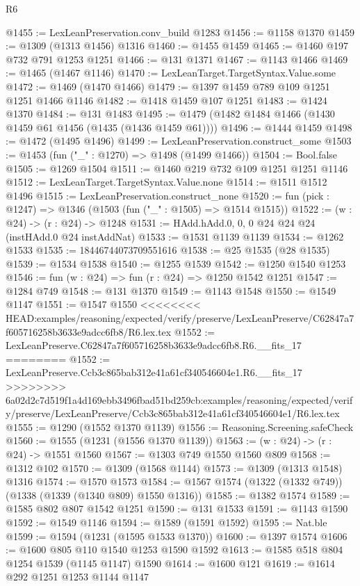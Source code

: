 \begin{lexlean}{R6}
\begin{coremodule}
{{{{{{{{{{{{{{{{{{{{{{{{{{{{{{{{{{{{{{{{{{{{{{{{{{{{{{{{{{{{{@1455 := LexLeanPreservation.conv_build @1283
@1456 := @1158 @1370
@1459 := @1309 (@1313 @1456) @1316
@1460 := @1455 @1459
@1465 := @1460 @197 @732 @791 @1253 @1251
@1466 := @131 @1371
@1467 := @1143 @1466
@1469 := @1465 (@1467 @1146)
@1470 := LexLeanTarget.TargetSyntax.Value.some
@1472 := @1469 (@1470 @1466)
@1479 := @1397 @1459 @789 @109 @1251 @1251 @1466 @1146
@1482 := @1418 @1459 @107 @1251
@1483 := @1424 @1370
@1484 := @131 @1483
@1495 := @1479 (@1482 @1484 @1466 (@1430 @1459 @61 @1456 (@1435 (@1436 @1459 @61))))
@1496 := @1444 @1459
@1498 := @1472 (@1495 @1496)
@1499 := LexLeanPreservation.construct_some
@1503 := @1453 (fun ("_" : @1270) => @1498 (@1499 @1466))
@1504 := Bool.false
@1505 := @1269 @1504
@1511 := @1460 @219 @732 @109 @1251 @1251 @1146
@1512 := LexLeanTarget.TargetSyntax.Value.none
@1514 := @1511 @1512 @1496
@1515 := LexLeanPreservation.construct_none
@1520 := fun (pick : @1247) => @1346 (@1503 (fun ("_" : @1505) => @1514 @1515))
@1522 := (w : @24) -> (r : @24) -> @1248
@1531 := HAdd.hAdd.{0, 0, 0} @24 @24 @24 (instHAdd.{0} @24 instAddNat)
@1533 := @1531 @1139 @1139
@1534 := @1262 @1533
@1535 := 18446744073709551616
@1538 := @25 @1535 (@28 @1535)
@1539 := @1534 @1538
@1540 := @1255 @1539
@1542 := @1250 @1540 @1253
@1546 := fun (w : @24) => fun (r : @24) => @1250 @1542 @1251
@1547 := @1284 @749
@1548 := @131 @1370
@1549 := @1143 @1548
@1550 := @1549 @1147
@1551 := @1547 @1550
<<<<<<<< HEAD:examples/reasoning/expected/verify/preserve/LexLeanPreserve/C62847a7f605716258b3633e9adcc6fb8/R6.lex.tex
@1552 := LexLeanPreserve.C62847a7f605716258b3633e9adcc6fb8.R6.__fits_17
========
@1552 := LexLeanPreserve.Ccb3c865bab312e41a61cf340546604e1.R6.__fits_17
>>>>>>>> 6a02d2c7d519f1a4d169ebb3496fbad51bd259cb:examples/reasoning/expected/verify/preserve/LexLeanPreserve/Ccb3c865bab312e41a61cf340546604e1/R6.lex.tex
@1555 := @1290 (@1552 @1370 @1139)
@1556 := Reasoning.Screening.safeCheck
@1560 := @1555 (@1231 (@1556 @1370 @1139))
@1563 := (w : @24) -> (r : @24) -> @1551 @1560
@1567 := @1303 @749 @1550 @1560 @809
@1568 := @1312 @102
@1570 := @1309 (@1568 @1144)
@1573 := @1309 (@1313 @1548) @1316
@1574 := @1570 @1573
@1584 := @1567 @1574 (@1322 (@1332 @749)) (@1338 (@1339 (@1340 @809) @1550 @1316))
@1585 := @1382 @1574
@1589 := @1585 @802 @807 @1542 @1251
@1590 := @131 @1533
@1591 := @1143 @1590
@1592 := @1549 @1146
@1594 := @1589 (@1591 @1592)
@1595 := Nat.ble
@1599 := @1594 (@1231 (@1595 @1533 @1370))
@1600 := @1397 @1574
@1606 := @1600 @805 @110 @1540 @1253 @1590 @1592
@1613 := @1585 @518 @804 @1254 @1539 (@1145 @1147) @1590
@1614 := @1600 @121
@1619 := @1614 @292 @1251 @1253 @1144 @1147
}}}}}}}}}}}}}}}}}}}}}}}}}}}}}}}}}}}}}}}}}}}}}}}}}}}}}}}}}}}}}
\end{coremodule}
\end{lexlean}
